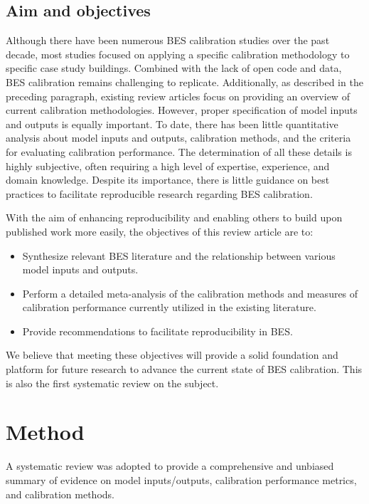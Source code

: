 \documentclass[review]{elsarticle}
\begin{document}
\subsection{Aim and objectives}
Although there have been numerous BES calibration studies over the past decade, most studies focused on applying a specific calibration methodology to specific case study buildings. Combined with the lack of open code and data, BES calibration remains challenging to replicate. Additionally, as described in the preceding paragraph, existing review articles focus on providing an overview of current calibration methodologies. However, proper specification of model inputs and outputs is equally important. To date, there has been little quantitative analysis about model inputs and outputs, calibration methods, and the criteria for evaluating calibration performance. The determination of all these details is highly subjective, often requiring a high level of expertise, experience, and domain knowledge. Despite its importance, there is little guidance on best practices to facilitate reproducible research regarding BES calibration. 

With the aim of enhancing reproducibility and enabling others to build upon published work more easily, the objectives of this review article are to:
\begin{itemize}
    \item Synthesize relevant BES literature and the relationship between various model inputs and outputs.
    \item Perform a detailed meta-analysis of the calibration methods and measures of calibration performance currently utilized in the existing literature. 
    \item Provide recommendations to facilitate reproducibility in BES.
\end{itemize}

We believe that meeting these objectives will provide a solid foundation and platform for future research to advance the current state of BES calibration. This is also the first systematic review on the subject.

\section{Method} \label{sec:method}

A systematic review was adopted to provide a comprehensive and unbiased summary of evidence on model inputs/outputs, calibration performance metrics, and calibration methods.
\end{document}
